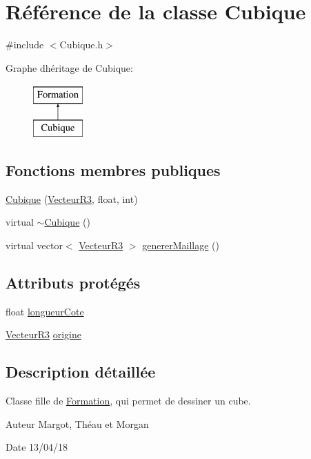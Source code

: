 \hypertarget{class_cubique}{}\section{Référence de la classe Cubique}
\label{class_cubique}


{\ttfamily \#include $<$Cubique.\+h$>$}

Graphe d\textquotesingle{}héritage de Cubique\+:\begin{figure}[H]
\begin{center}
\leavevmode
\includegraphics[height=2.000000cm]{class_cubique}
\end{center}
\end{figure}
\subsection*{Fonctions membres publiques}
\begin{DoxyCompactItemize}
\item 
\mbox{\hyperlink{class_cubique_ae437848fa7a382f250cf84d9b5c35154}{Cubique}} (\mbox{\hyperlink{class_vecteur_r3}{Vecteur\+R3}}, float, int)
\item 
virtual \mbox{\hyperlink{class_cubique_a5880f332af7c4f412b74ae9a6a71909a}{$\sim$\+Cubique}} ()
\item 
virtual vector$<$ \mbox{\hyperlink{class_vecteur_r3}{Vecteur\+R3}} $>$ \mbox{\hyperlink{class_cubique_ac7f56ed79d1732b2bf59e0456b3a2f6f}{generer\+Maillage}} ()
\end{DoxyCompactItemize}
\subsection*{Attributs protégés}
\begin{DoxyCompactItemize}
\item 
float \mbox{\hyperlink{class_cubique_a2d8ca11e6bf2f6b73aad6ca1f595990e}{longueur\+Cote}}
\item 
\mbox{\hyperlink{class_vecteur_r3}{Vecteur\+R3}} \mbox{\hyperlink{class_cubique_ab9d0ac86eeba76c72022bd84c401bb59}{origine}}
\end{DoxyCompactItemize}


\subsection{Description détaillée}
Classe fille de \mbox{\hyperlink{class_formation}{Formation}}, qui permet de dessiner un cube. \begin{DoxyAuthor}{Auteur}
Margot, Théau et Morgan 
\end{DoxyAuthor}
\begin{DoxyDate}{Date}
13/04/18 
\end{DoxyDate}


